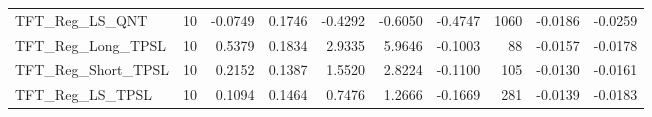 \begin{tabular}{llrrrrrrrr}
\cline{1-10}
TFT\_Reg\_LS\_QNT & 10 & -0.0749 & 0.1746 & -0.4292 & -0.6050 & -0.4747 & 1060 & -0.0186 & -0.0259 \\
\cline{1-10}
TFT\_Reg\_Long\_TPSL & 10 & 0.5379 & 0.1834 & 2.9335 & 5.9646 & -0.1003 & 88 & -0.0157 & -0.0178 \\
\cline{1-10}
TFT\_Reg\_Short\_TPSL & 10 & 0.2152 & 0.1387 & 1.5520 & 2.8224 & -0.1100 & 105 & -0.0130 & -0.0161 \\
\cline{1-10}
TFT\_Reg\_LS\_TPSL & 10 & 0.1094 & 0.1464 & 0.7476 & 1.2666 & -0.1669 & 281 & -0.0139 & -0.0183 \\
\cline{1-10}
\bottomrule
\end{tabular}
